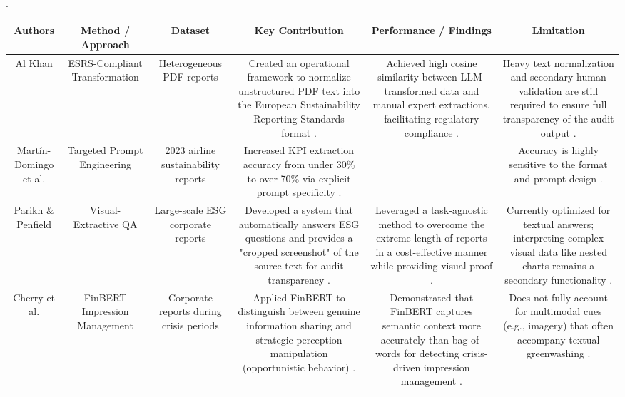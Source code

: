 \documentclass{article}
\begin{document}
.
\begin{table}[h!]
\centering
\begin{tabular}{|c|c|c|c|c|c|}
\hline
Authors & Method / Approach & Dataset & Key Contribution & \textbf{Performance / Findings} & Limitation \\ \hline
Al Khan  \parencite{al_khan_a93bc800} & ESRS-Compliant Transformation & Heterogeneous PDF reports  \parencite{al_khan_a93bc800} & Created an operational framework to normalize unstructured PDF text into the European Sustainability Reporting Standards format  \parencite{al_khan_a93bc800}. & Achieved high cosine similarity between LLM-transformed data and manual expert extractions, facilitating regulatory compliance  \parencite{al_khan_a93bc800}. & Heavy text normalization and secondary human validation are still required to ensure full transparency of the audit output  \parencite{al_khan_a93bc800}. \\ \hline
Martín-Domingo et al.  \parencite{luis_mart_n_domingo_2465e14b} & Targeted Prompt Engineering & 2023 airline sustainability reports  \parencite{luis_mart_n_domingo_2465e14b} & Increased KPI extraction accuracy from under 30\% to over 70\% via explicit prompt specificity  \parencite{luis_mart_n_domingo_2465e14b}. & ~ & Accuracy is highly sensitive to the format and prompt design  \parencite{luis_mart_n_domingo_2465e14b}. \\ \hline
Parikh \& Penfield  \parencite{pulkit_parikh_19ae49ff} & Visual-Extractive QA & Large-scale ESG corporate reports  \parencite{pulkit_parikh_19ae49ff} & Developed a system that automatically answers ESG questions and provides a "cropped screenshot" of the source text for audit transparency  \parencite{pulkit_parikh_19ae49ff}. & Leveraged a task-agnostic method to overcome the extreme length of reports in a cost-effective manner while providing visual proof  \parencite{pulkit_parikh_19ae49ff}. & Currently optimized for textual answers; interpreting complex visual data like nested charts remains a secondary functionality  \parencite{pulkit_parikh_19ae49ff}. \\ \hline
Cherry et al.  \parencite{caroline_cherry_e20dcf30} & FinBERT Impression Management & Corporate reports during crisis periods  \parencite{caroline_cherry_e20dcf30} & Applied FinBERT to distinguish between genuine information sharing and strategic perception manipulation (opportunistic behavior)  \parencite{caroline_cherry_e20dcf30}. & Demonstrated that FinBERT captures semantic context more accurately than bag-of-words for detecting crisis-driven impression management  \parencite{caroline_cherry_e20dcf30}. & Does not fully account for multimodal cues (e.g., imagery) that often accompany textual greenwashing  \parencite{caroline_cherry_e20dcf30}. \\ \hline

\end{tabular}
\end{table}
\end{document}
